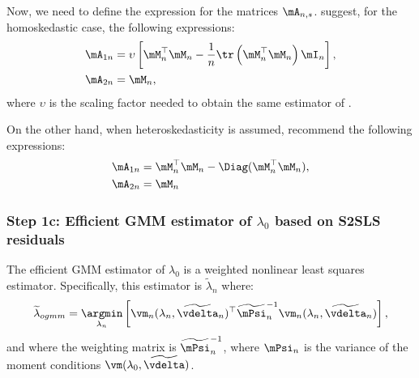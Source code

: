 Now, we need to define the expression for the matrices $\mA_{n,s}$. \cite{drukker2013two} suggest, for the homoskedastic case, the following expressions:
\begin{equation*}
  \begin{aligned}
    \mA_{1n} & = \upsilon \left[\mM^\top_n\mM_n - \frac{1}{n}\tr\left(\mM^\top_n\mM_n\right)\mI_n\right],\\ 
    \mA_{2n} & = \mM_n,
  \end{aligned}
\end{equation*}
%
where $\upsilon$ is the scaling factor needed to obtain the same estimator of \cite{kelejian1998generalized, kelejian1999generalized}. 

On the other hand, when heteroskedasticity is assumed, \cite{kelejian2010specification} recommend the following expressions:
\begin{equation*}
\begin{aligned}
\mA_{1n} & = \mM^\top_n\mM_n  - \Diag(\mM^\top_n\mM_n), \\
\mA_{2n} & = \mM_n
\end{aligned}
\end{equation*}


\subsubsection{Step 1c: Efficient GMM estimator of $\lambda_0$ based on S2SLS residuals}

The efficient GMM estimator of $\lambda_0$ is a weighted nonlinear least squares estimator. Specifically, this estimator is $\widetilde{\lambda}_n$ where:
\begin{equation}\label{eq:nonlinear-gmm-lambda}
\widetilde{\lambda}_{ogmm} = \underset{\lambda_n}{\argmin} \left[\vm_n(\lambda_n,\widetilde{\vdelta}_n)^\top\widetilde{\mPsi}^{-1}_n\vm_n(\lambda_n,\widetilde{\vdelta}_n) \right],
\end{equation}
%
and where the weighting matrix is $\widetilde{\mPsi}^{-1}_n$, where $\mPsi_n$ is the variance of the moment conditions $\vm(\lambda_0,\widetilde{\vdelta})$. 


